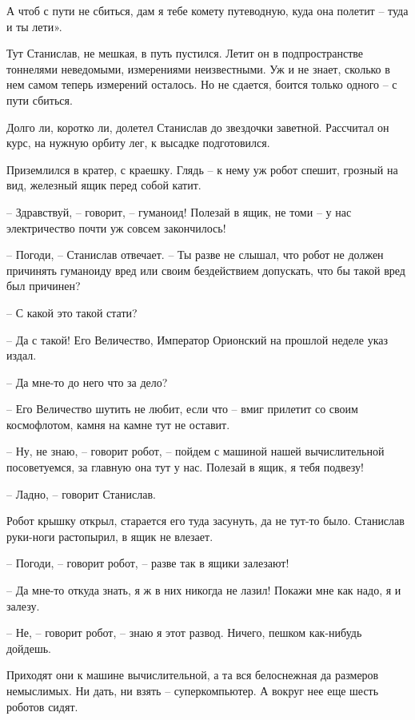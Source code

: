 \documentclass[ebook,oneside,final,openright]{memoir}
\begin{document}
\par
А чтоб с пути не сбиться, дам я тебе комету путеводную, куда она полетит – туда и ты лети».\par
\par
Тут Станислав, не мешкая, в путь пустился. Летит он в подпространстве тоннелями неведомыми, измерениями неизвестными. Уж и не знает, сколько в нем самом теперь измерений осталось. Но не сдается, боится только одного – с пути сбиться.\par
\par
Долго ли, коротко ли, долетел Станислав до звездочки заветной. Рассчитал он курс, на нужную орбиту лег, к высадке подготовился.\par
\par
Приземлился в кратер, с краешку. Глядь – к нему уж робот спешит, грозный на вид, железный ящик перед собой катит.\par
– Здравствуй, – говорит, – гуманоид! Полезай в ящик, не томи – у нас электричество почти уж совсем закончилось!\par
– Погоди, – Станислав отвечает. – Ты разве не слышал, что робот не должен причинять гуманоиду вред или своим бездействием допускать, что бы такой вред был причинен?\par
– С какой это такой стати?\par
– Да с такой! Его Величество, Император Орионский на прошлой неделе указ издал.\par
– Да мне-то до него что за дело?\par
– Его Величество шутить не любит, если что – вмиг прилетит со своим космофлотом, камня на камне тут не оставит.\par
– Ну, не знаю, – говорит робот, – пойдем с машиной нашей вычислительной посоветуемся, за главную она тут у нас. Полезай в ящик, я тебя подвезу!\par
– Ладно, – говорит Станислав.\par
Робот крышку открыл, старается его туда засунуть, да не тут-то было. Станислав руки-ноги растопырил, в ящик не влезает. \par
– Погоди, – говорит робот, – разве так в ящики залезают! \par
– Да мне-то откуда знать, я ж в них никогда не лазил! Покажи мне как надо, я и залезу. \par
– Не, – говорит робот, – знаю я этот развод. Ничего, пешком как-нибудь дойдешь.\par
\par
Приходят они к машине вычислительной, а та вся белоснежная да размеров немыслимых. Ни дать, ни взять – суперкомпьютер. А вокруг нее еще шесть роботов сидят. \par
\end{document}
